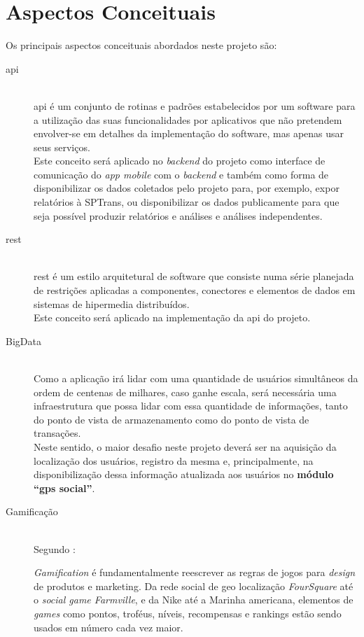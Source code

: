 \chapter{Aspectos Conceituais}\label{chp:aspectosConceituais}
Os principais aspectos conceituais abordados neste projeto são:
\begin{description}
    \item[\gls{api}] \cite{apifoldoc} \hfill \\
        \gls{api} é um conjunto de rotinas e padrões estabelecidos por um software para a utilização das suas funcionalidades por aplicativos que não pretendem envolver-se em detalhes da implementação do software, mas apenas usar seus serviços.\\
        Este conceito será aplicado no \textit{backend} do projeto como interface de comunicação do \textit{app mobile} com o \textit{backend} e também como forma de disponibilizar os dados coletados pelo projeto para, por exemplo, expor relatórios à SPTrans, ou disponibilizar os dados publicamente para que seja possível produzir relatórios e análises e análises independentes.%
%
	\item[\gls{rest}] \cite{Fielding2000} \hfill \\
	    \gls{rest} é um estilo arquitetural de software que consiste numa série planejada de restrições aplicadas a componentes, conectores e elementos de dados em sistemas de hipermedia distribuídos. \\
	    Este conceito será aplicado na implementação da \gls{api} do projeto.%
%
	\item[BigData] \hfill \\
	    Como a aplicação irá lidar com uma quantidade de usuários simultâneos da ordem de centenas de milhares, caso ganhe escala, será necessária uma infraestrutura que possa lidar com essa quantidade de informações, tanto do ponto de vista de armazenamento como do ponto de vista de transações.\\
	    Neste sentido, o maior desafio neste projeto deverá ser na aquisição da localização dos usuários, registro da mesma e, principalmente, na disponibilização dessa informação atualizada aos usuários no \textbf{módulo ``gps social''}.%
%
	\item[Gamificação] \hfill \\
	    Segundo :
	    \begin{citacao}
	    \textit{Gamification} é fundamentalmente reescrever as regras de jogos para \textit{design} de produtos e marketing. Da rede social de geo localização \textit{FourSquare} até o \textit{social game Farmville}, e da Nike até a Marinha americana, elementos de \textit{games} como pontos, troféus, níveis, recompensas e rankings estão sendo usados em número cada vez maior.

\end{citacao}
\end{description}
